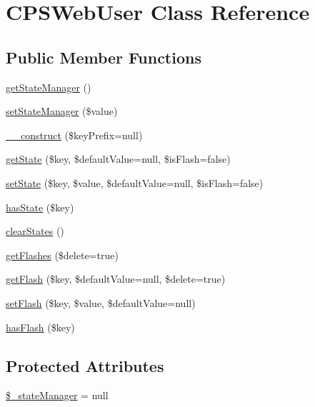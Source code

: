 \hypertarget{classCPSWebUser}{
\section{CPSWebUser Class Reference}
\label{classCPSWebUser}
}
\subsection*{Public Member Functions}
\begin{DoxyCompactItemize}
\item 
\hyperlink{classCPSWebUser_a491b3681067e7f3651afb7ff1bf533e8}{getStateManager} ()
\item 
\hyperlink{classCPSWebUser_a345ca6205883a4aee6b89cd27fd093b6}{setStateManager} (\$value)
\item 
\hyperlink{classCPSWebUser_a1ff82bdcd6747129d97e12934db2def8}{\_\-\_\-construct} (\$keyPrefix=null)
\item 
\hyperlink{classCPSWebUser_a8bf40ae0d2528f36e3df46e28f56e1c8}{getState} (\$key, \$defaultValue=null, \$isFlash=false)
\item 
\hyperlink{classCPSWebUser_aafc00fb76764975385c8a3fa54cfece3}{setState} (\$key, \$value, \$defaultValue=null, \$isFlash=false)
\item 
\hyperlink{classCPSWebUser_ab04376998e1a1094f4c415a79018ca96}{hasState} (\$key)
\item 
\hyperlink{classCPSWebUser_a5623d45a4dfcce122b732b0377364d66}{clearStates} ()
\item 
\hyperlink{classCPSWebUser_ae29eea2995e7e3e2789181f632ae95a5}{getFlashes} (\$delete=true)
\item 
\hyperlink{classCPSWebUser_a3ac1554d96ad28d5ab40d8ea5b6a11fe}{getFlash} (\$key, \$defaultValue=null, \$delete=true)
\item 
\hyperlink{classCPSWebUser_a7ae4f6603338ff51e36d4da8219b3a64}{setFlash} (\$key, \$value, \$defaultValue=null)
\item 
\hyperlink{classCPSWebUser_a0ac89d09ac48bba800f8dd87a0e790fc}{hasFlash} (\$key)
\end{DoxyCompactItemize}
\subsection*{Protected Attributes}
\begin{DoxyCompactItemize}
\item 
\hyperlink{classCPSWebUser_a107270c20cd489703e8868eaa0621a43}{\$\_\-stateManager} = null
\end{DoxyCompactItemize}


